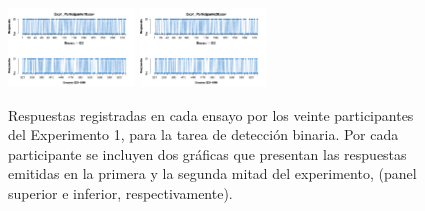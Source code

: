 \begin{figure}[th]
\includegraphics[width=0.30\textwidth]{Figures/Response_Exp1_P19} \includegraphics[width=0.30\textwidth]{Figures/Response_Exp1_P20} 
\caption[Respuesta binaria registrada ensayo a ensayo; Experimento 1]{Respuestas registradas en cada ensayo por los veinte participantes del Experimento 1, para la tarea de detección binaria. Por cada participante se incluyen dos gráficas que presentan las respuestas emitidas en la primera y la segunda mitad del experimento, (panel superior e inferior, respectivamente).}
\label{fig:Response_E1}
\end{figure}

